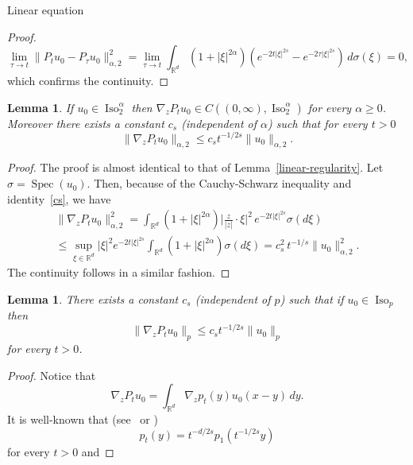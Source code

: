 \documentclass[a4paper,10pt,fleqn]{amsart}
\newtheorem{lemma}[theorem]{Lemma}
\theoremstyle{remark}
\theoremstyle{definition}
\DeclareMathOperator{\Iso}{Iso}
\DeclareMathOperator{\Spec}{Spec}
\newcommand{\grad} {\nabla_{\!z}}
\newcommand{\X} {{\mathbb{R}^d}}
\renewcommand{\=} {\overset{d}{=}}
\begin{document}
\begin{section}{Linear equation}
\begin{proof}
\begin{equation*}
      \lim_{\tau\to t}\|P_tu_0- P_\tau u_0\|_{\alpha,2}^2 
      = \lim_{\tau\to t} \int_\X(1+ |\xi|^{2\alpha}) (e^{-2t|\xi|^{2s}}-e^{-2\tau|\xi|^{2s}})\,d\sigma(\xi) = 0,
     \end{equation*}
     which confirms the continuity.
      \end{proof}
  \begin{lemma}\label{linear-regularity1}
       If $u_0\in\Iso_2^\alpha$ 
       then $\grad P_tu_0\in C((0,\infty),\Iso^\alpha_2)$ for every $\alpha\geq 0$.
       Moreover
       there exists a constant $c_{s}$ (independent of $\alpha$) such that for every $t>0$
       \begin{equation*}
        \|\grad P_tu_0\|_{\alpha,2}\leq c_{s}t^{-1/2s}\|u_0\|_{\alpha,2}.
       \end{equation*}
  \end{lemma}
  \begin{proof}
        The proof is almost identical to that of Lemma~\ref{linear-regularity}.
	Let $\sigma = \Spec(u_0)$. 
        Then, because of the Cauchy-Schwarz inequality and identity~\eqref{cs}, we have 
        \begin{multline*}
          \|\grad P_tu_0\|_{\alpha,2}^2 = \int_\X (1+|\xi|^{2\alpha})\big|\tfrac{z}{|z|}\cdot\xi\big|^2\, e^{-2t|\xi|^{2s}} \sigma(d\xi) \\
          \leq \sup_{\xi\in\X}|\xi|^{2} e^{-2t|\xi|^{2s}}\int_\X(1+|\xi|^{2\alpha})\sigma(d\xi)= c_{s}^2\,t^{-1/s}\|u_0\|_{\alpha,2}^2.
        \end{multline*}
        The continuity follows in a similar fashion.
  \end{proof}
  \begin{lemma}\label{semigroup-estimate}
    There exists a constant ${c}_s$ (independent of $p$) such that
    if $u_0\in\Iso_p$ then
    \begin{equation*}
     \|\grad P_t u_0\|_p \leq {c}_s t^{-1/2s}\|u_0\|_p
    \end{equation*}
    for every $t>0$.
  \end{lemma}
  \begin{proof}
   Notice that
   \begin{equation*}
    \grad P_t u_0 = \int_\X\grad p_t(y)u_0(x-y)\,dy.
   \end{equation*}
   It is well-known that (see~\cite{MR2373320} or \cite{MR3211862})
   \begin{equation*}
    p_t(y) = t^{-d/2s}	p_1(t^{-1/2s}y)
   \end{equation*}
for every $t>0$ and 

\end{proof}
\end{section}
\end{document}

